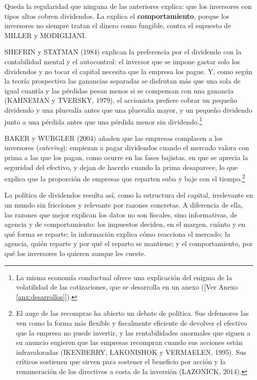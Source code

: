 \documentclass[10pt,a4paper]{article}
\newcommand{\authorfont}[1]{{\fontfamily{EBGaramond-TLF}\selectfont #1}}
\newcounter{anexo}
\begin{document}
Queda la regularidad que ninguna de las anteriores explica: que los inversores con tipos altos cobren dividendos. La explica el \textbf{comportamiento}, porque los inversores no siempre tratan el dinero como fungible, contra el supuesto de MILLER y MODIGLIANI.

SHEFRIN y STATMAN (1984) explican la preferencia por el dividendo con la contabilidad mental y el autocontrol: el inversor que se impone gastar solo los dividendos y no tocar el capital necesita que la empresa los pague. Y, como según la teoría prospectiva las ganancias separadas se disfrutan más que una sola de igual cuantía y las pérdidas pesan menos si se compensan con una ganancia (KAHNEMAN y TVERSKY, 1979), el accionista prefiere cobrar un pequeño dividendo y una plusvalía antes que una plusvalía mayor, y un pequeño dividendo junto a una pérdida antes que una pérdida menor sin dividendo.\footnote{%
    La misma economía conductual ofrece una explicación del enigma de la volatilidad de las cotizaciones, que se desarrolla en un anexo ([\authorfont{Ver Anexo \ref{anx:desarrollos}}]).
}

BAKER y WURGLER (2004) añaden que las empresas complacen a los inversores (\textit{catering}): empiezan a pagar dividendos cuando el mercado valora con prima a las que los pagan, como ocurre en las fases bajistas, en que se aprecia la seguridad del efectivo, y dejan de hacerlo cuando la prima desaparece, lo que explica que la proporción de empresas que reparten suba y baje con el tiempo.\footnote{%
    El auge de las recompras ha abierto un debate de política. Sus defensores las ven como la forma más flexible y fiscalmente eficiente de devolver el efectivo que la empresa no puede invertir, y las rentabilidades anormales que siguen a su anuncio sugieren que las empresas recompran cuando sus acciones están infravaloradas (IKENBERRY, LAKONISHOK y VERMAELEN, 1995). Sus críticos sostienen que sirven para sostener el beneficio por acción y la remuneración de los directivos a costa de la inversión (LAZONICK, 2014).
}

La política de dividendos resulta así, como la estructura del capital, irrelevante en un mundo sin fricciones y relevante por razones concretas. A diferencia de ella, las razones que mejor explican los datos no son fiscales, sino informativas, de agencia y de comportamiento: los impuestos deciden, en el margen, cuánto y en qué forma se reparte; la información explica cómo reacciona el mercado; la agencia, quién reparte y por qué el reparto se mantiene; y el comportamiento, por qué los inversores lo quieren aunque les cueste.
\end{document}
